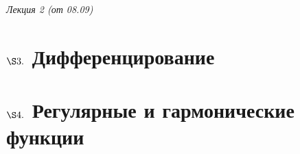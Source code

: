 \begin{flushright}
    \textit{Лекция 2 (от 08.09)}
\end{flushright}
\section{$\S 3.$ Дифференцирование}
\section{$\S 4.$ Регулярные и гармонические функции}
